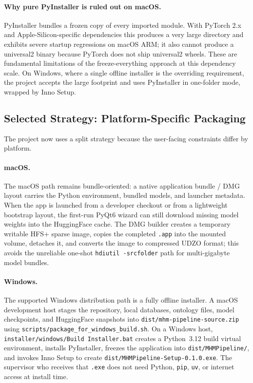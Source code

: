 \documentclass[12pt]{article}
\newcommand{\filepath}[1]{\texttt{\small #1}}
\newcommand{\code}[1]{\texttt{#1}}
\begin{document}
\paragraph{Why pure PyInstaller is ruled out on macOS.} PyInstaller bundles a frozen copy of every imported module. With PyTorch 2.x and Apple-Silicon-specific dependencies this produces a very large directory and exhibits severe startup regressions on macOS ARM; it also cannot produce a universal2 binary because PyTorch does not ship universal2 wheels. These are fundamental limitations of the freeze-everything approach at this dependency scale. On Windows, where a single offline installer is the overriding requirement, the project accepts the large footprint and uses PyInstaller in one-folder mode, wrapped by Inno Setup.

\subsection{Selected Strategy: Platform-Specific Packaging}

The project now uses a split strategy because the user-facing constraints differ by platform.

\paragraph{macOS.} The macOS path remains bundle-oriented: a native application bundle / DMG layout carries the Python environment, bundled models, and launcher metadata. When the app is launched from a developer checkout or from a lightweight bootstrap layout, the first-run PyQt6 wizard can still download missing model weights into the HuggingFace cache.
The DMG builder creates a temporary writable HFS+ sparse image, copies the completed \code{.app} into the mounted volume, detaches it, and converts the image to compressed UDZO format; this avoids the unreliable one-shot \code{hdiutil -srcfolder} path for multi-gigabyte model bundles.

\paragraph{Windows.} The supported Windows distribution path is a fully offline installer. A macOS development host stages the repository, local databases, ontology files, model checkpoints, and HuggingFace snapshots into \filepath{dist/mhm-pipeline-source.zip} using \filepath{scripts/package\_for\_windows\_build.sh}. On a Windows host, \filepath{installer/windows/Build Installer.bat} creates a Python~3.12 build virtual environment, installs PyInstaller, freezes the application into \filepath{dist/MHMPipeline/}, and invokes Inno Setup to create \filepath{dist/MHMPipeline-Setup-0.1.0.exe}. The supervisor who receives that \code{.exe} does not need Python, \code{pip}, \code{uv}, or internet access at install time.
\end{document}

